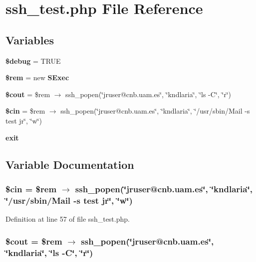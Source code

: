 \section{ssh\_\-test.php File Reference}
\label{ssh__test_8php}
\subsection*{Variables}
\begin{CompactItemize}
\item 
{\bf \$debug} = TRUE
\item 
{\bf \$rem} = new {\bf SExec}
\item 
{\bf \$cout} = \$rem $\rightarrow$ ssh\_\-popen(\char`\"{}jruser@cnb.uam.es\char`\"{}, \char`\"{}kndlaria\char`\"{}, \char`\"{}ls -C\char`\"{}, \char`\"{}r\char`\"{})
\item 
{\bf \$cin} = \$rem $\rightarrow$ ssh\_\-popen(\char`\"{}jruser@cnb.uam.es\char`\"{}, \char`\"{}kndlaria\char`\"{}, \char`\"{}/usr/sbin/Mail -s test jr\char`\"{}, \char`\"{}w\char`\"{})
\item 
{\bf exit}
\end{CompactItemize}


\subsection{Variable Documentation}
\subsubsection{\setlength{\rightskip}{0pt plus 5cm}\$cin = \$rem $\rightarrow$ ssh\_\-popen(\char`\"{}jruser@cnb.uam.es\char`\"{}, \char`\"{}kndlaria\char`\"{}, \char`\"{}/usr/sbin/Mail -s test jr\char`\"{}, \char`\"{}w\char`\"{})}\label{ssh__test_8php_a3}




Definition at line 57 of file ssh\_\-test.php.
\subsubsection{\setlength{\rightskip}{0pt plus 5cm}\$cout = \$rem $\rightarrow$ ssh\_\-popen(\char`\"{}jruser@cnb.uam.es\char`\"{}, \char`\"{}kndlaria\char`\"{}, \char`\"{}ls -C\char`\"{}, \char`\"{}r\char`\"{})}\label{ssh__test_8php_a2}




